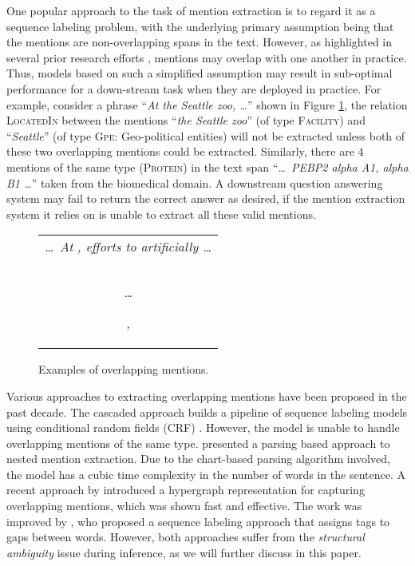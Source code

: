 \documentclass[11pt,a4paper]{article}
\theoremstyle{theorem}
\begin{document}
One popular approach to the task of mention extraction is to regard it as a sequence labeling problem, with the underlying primary assumption being that the mentions are non-overlapping spans in the text.
However, as highlighted in several prior research efforts \cite{alex2007recognising,finkel2009nested,lu2015joint}, mentions may overlap with one another in practice.
Thus, models based on such a simplified assumption may result in sub-optimal performance for a down-stream task when they are deployed in practice.
For example, consider a phrase ``{\em At the Seattle zoo, \dots}'' shown in Figure \ref{fig:inst}, the relation \textsc{LocatedIn} between the  mentions ``{\em the Seattle zoo}'' (of type \textsc{Facility}) and ``{\em Seattle}'' (of type \textsc{Gpe}: Geo-political entities) will not be extracted unless both of these two overlapping mentions could be extracted.
Similarly, there are 4 mentions of the same type (\textsc{Protein}) in the text span ``{\em \dots\ PEBP2 alpha A1, alpha B1 \dots}'' taken from the biomedical domain. A downstream question answering system may fail to return the correct answer as desired, if the mention extraction system it relies on is unable to extract all these valid mentions.



\begin{figure}[t!]
\begin{center}
\scalebox{0.8}
{\footnotesize
\def\arraystretch{0.4}\tabcolsep=8pt
\setlength\doublerulesep{1pt}
\begin{tabular}{c}
\\
{\em \dots\ At }
{\em , efforts to  artificially  \dots}\\\\
\hline
\\
{\em \dots 

}
{\em , 
}\\
\end{tabular}
}\end{center}
\vspace{-3.5mm}
\caption{\color{black}Examples of overlapping mentions.}
\label{fig:inst}
\end{figure}


Various approaches to extracting overlapping mentions have been proposed in the past decade.
The cascaded approach \cite{alex2007recognising} builds a pipeline of sequence labeling models using conditional random fields (CRF) \cite{lafferty2001conditional}.
However, the model is unable to handle overlapping mentions of the same type.
\citet{finkel2009nested} presented a parsing based approach to nested mention extraction.
Due to the chart-based parsing algorithm involved, the model has a cubic time complexity in the number of words in the sentence.
A recent approach by \citet{lu2015joint} introduced a hypergraph representation for capturing overlapping mentions, which was shown fast and effective.
The work was improved by \citet{muis2017labeling}, who proposed a sequence labeling approach that assigns tags to gaps between words.
However, both approaches suffer from the {\em structural ambiguity} issue during inference, as we will further discuss in this paper.
\end{document}
